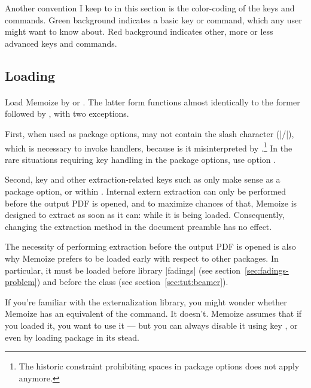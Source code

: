 \documentclass[a4paper,11pt]{article}
\begin{document}
Another convention I keep to in this section is the color-coding of the keys
and commands.  Green background indicates a basic key or command, which any
user might want to know about.  Red background indicates other, more or less
advanced keys and commands.


\subsection{Loading}
\label{sec:ref:loading}
\paragraph{}

Load Memoize by  or
.  The latter form functions
almost identically to the former followed by
, with two exceptions.

First, when used as package options,  may not contain the slash
character (|/|), which is necessary to invoke  handlers, because
is it misinterpreted by .\footnote{The historic 
  constraint prohibiting spaces in package options does not apply anymore.}  In
the rare situations requiring key handling in the package options, use option
.

Second, key  and other extraction-related keys such as
 only make sense as a package option, or
within .  Internal extern extraction can only be performed
before the output PDF is opened, and to maximize chances of that, Memoize is
designed to extract as soon as it can: while it is being loaded.  Consequently,
changing the extraction method in the document preamble has no effect.

The necessity of performing extraction before the output PDF is opened is also
why Memoize prefers to be loaded early with respect to other packages.  In
particular, it must be loaded before \PGF library |fadings| (see
section~\ref{sec:fadings-problem}) and before the  class (see
section~\ref{sec:tut:beamer}).

If you're familiar with the \TikZ externalization library, you might wonder
whether Memoize has an equivalent of the  command.  It
doesn't.  Memoize assumes that if you loaded it, you want to use it --- but you
can always disable it using key , or even by loading package
 in its stead.
\end{document}
